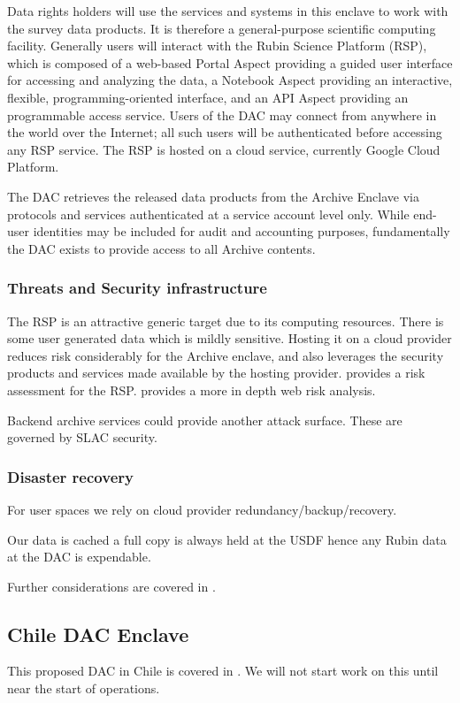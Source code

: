 Data rights holders will use the services and systems in this enclave to work with the survey data products.
It is therefore a general-purpose scientific computing facility. Generally users will interact with the Rubin Science Platform (\gls{RSP}), which is composed of a web-based Portal Aspect providing a guided user interface for accessing and analyzing the data, a Notebook Aspect providing an interactive, flexible, programming-oriented interface, and an API Aspect providing an programmable access service.
Users of the DAC may connect from anywhere in the world over the Internet; all such users will be authenticated before accessing any \gls{RSP} service.
The \gls{RSP} is hosted on a cloud service, currently  Google Cloud Platform.

The DAC retrieves the released data products from the \gls{Archive} Enclave via protocols and services authenticated at a service account level only. While end-user identities may be included for audit and accounting purposes, fundamentally the DAC exists to provide access to all \gls{Archive} contents.

\subsubsection{ Threats and Security infrastructure}
The \gls{RSP} is  an attractive generic target due to its computing resources.
There is some user generated data which is mildly sensitive.
Hosting it on a cloud provider reduces risk considerably for the Archive enclave, and also leverages the security products and services made available by the hosting provider.
 provides a risk assessment for the \gls{RSP}.
 provides a more in depth web risk analysis.

Backend archive services could provide another attack surface.
These are governed by \gls{SLAC} security.

\subsubsection{Disaster recovery}
For user  spaces we rely on cloud provider redundancy/backup/recovery.

Our data is cached a full copy is always held at the \gls{USDF} hence any Rubin data at the DAC is expendable.

Further considerations are covered in .

\subsection{ Chile \gls{DAC} Enclave}
This proposed DAC in Chile is covered in \cite{LDM-572}.
We will not start work on this until near the start of operations.
